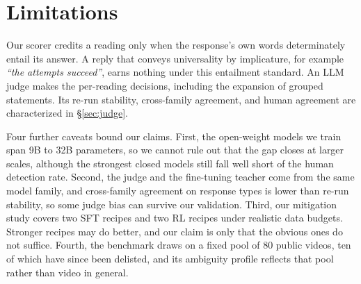 \section*{Limitations}

Our scorer credits a reading only when the response's own words determinately entail its answer. A reply that conveys universality by implicature, for example \textit{``the attempts succeed''}, earns nothing under this entailment standard. An LLM judge makes the per-reading decisions, including the expansion of grouped statements. Its re-run stability, cross-family agreement, and human agreement are characterized in \S\ref{sec:judge}.

Four further caveats bound our claims. First, the open-weight models we train span 9B to 32B parameters, so we cannot rule out that the gap closes at larger scales, although the strongest closed models still fall well short of the human detection rate. Second, the judge and the fine-tuning teacher come from the same model family, and cross-family agreement on response types is lower than re-run stability, so some judge bias can survive our validation. Third, our mitigation study covers two SFT recipes and two RL recipes under realistic data budgets. Stronger recipes may do better, and our claim is only that the obvious ones do not suffice. Fourth, the benchmark draws on a fixed pool of 80 public videos, ten of which have since been delisted, and its ambiguity profile reflects that pool rather than video in general.

